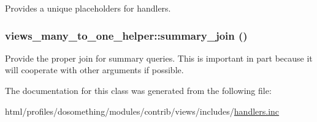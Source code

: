 Provides a unique placeholders for handlers. \hypertarget{classviews__many__to__one__helper_a3cca1469412856288fcbaa5c1f627192}{
\subsubsection[{summary\_\-join}]{\setlength{\rightskip}{0pt plus 5cm}views\_\-many\_\-to\_\-one\_\-helper::summary\_\-join ()}}
\label{classviews__many__to__one__helper_a3cca1469412856288fcbaa5c1f627192}
Provide the proper join for summary queries. This is important in part because it will cooperate with other arguments if possible. 

The documentation for this class was generated from the following file:\begin{DoxyCompactItemize}
\item 
html/profiles/dosomething/modules/contrib/views/includes/\hyperlink{handlers_8inc}{handlers.inc}\end{DoxyCompactItemize}
